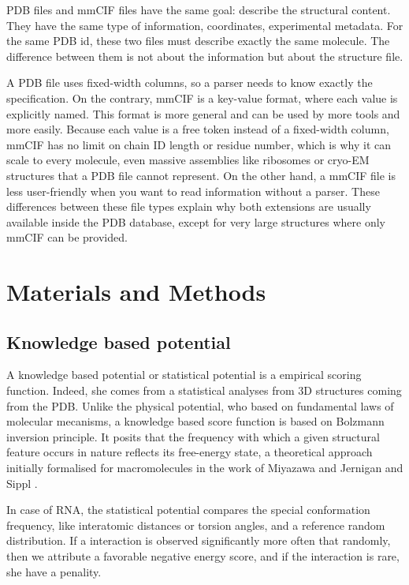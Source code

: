 \documentclass[11pt,a4paper]{article}
\begin{document}
PDB files and mmCIF files have the same goal: describe the structural content. They have the same type of information, coordinates, experimental metadata. For the same PDB id, these two files must describe exactly the same molecule. The difference between them is not about the information but about the structure file.

A PDB file uses fixed-width columns, so a parser needs to know exactly the specification. On the contrary, mmCIF is a key-value format, where each value is explicitly named. This format is more general and can be used by more tools and more easily. Because each value is a free token instead of a fixed-width column, mmCIF has no limit on chain ID length or residue number, which is why it can scale to every molecule, even massive assemblies like ribosomes or cryo-EM structures that a PDB file cannot represent. On the other hand, a mmCIF file is less user-friendly when you want to read information without a parser. These differences between these file types explain why both extensions are usually available inside the PDB database, except for very large structures where only mmCIF can be provided.


\newpage
\section{Materials and Methods}
\label{sec:materials-methods}
\subsection{Knowledge based potential}

A knowledge based potential or statistical potential is a empirical scoring function. Indeed, she comes from a statistical analyses from 3D structures coming from the PDB. Unlike the physical potential, who based on fundamental laws of molecular mecanisms, a knowledge based score function is based on Bolzmann inversion principle. It posits that the frequency with which a given structural feature occurs in nature reflects its free-energy state, a theoretical approach initially formalised for macromolecules in the work of Miyazawa and Jernigan \cite{Miyazawa1985EstimationOE} and Sippl \cite{sippl_calculation_1990}.

In case of RNA, the statistical potential compares the special conformation frequency, like interatomic distances or  torsion angles, and a reference random distribution. If a interaction is observed significantly more often that randomly, then we attribute a favorable negative energy score, and if the interaction is rare, she have a penality. 
\end{document}
